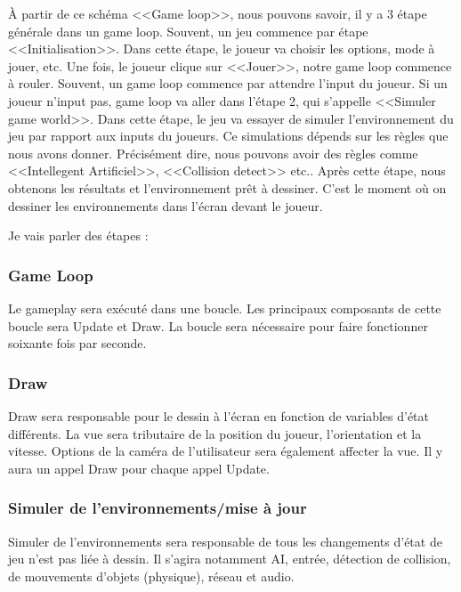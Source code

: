 
À partir de ce schéma <<Game loop>>, nous pouvons savoir, il y a 3 étape générale dans un game loop. Souvent, un jeu commence par étape <<Initialisation>>. Dans cette étape, le joueur va choisir les options, mode à jouer, etc. Une fois, le joueur clique sur <<Jouer>>, notre game loop commence à rouler. Souvent, un game loop commence par attendre l'input du joueur. Si un joueur n'input pas, game loop va aller dans l'étape 2, qui s'appelle <<Simuler game world>>. Dans cette étape, le jeu va essayer de simuler l'environnement du jeu par rapport aux inputs du joueurs. Ce simulations dépends sur les règles que nous avons donner. Précisément dire, nous pouvons avoir des règles comme <<Intellegent Artificiel>>, <<Collision detect>> etc.. Après cette étape, nous obtenons les résultats et l'environnement prêt à dessiner. C'est le moment où on dessiner les environnements dans l'écran devant le joueur.

Je vais parler des étapes :

\subsubsection{Game Loop} %
\label{ssub:game_loop}

Le gameplay sera exécuté dans une boucle. Les principaux composants de cette boucle sera Update et Draw. La boucle sera nécessaire pour faire fonctionner soixante fois par seconde.

\subsubsection{Draw} %
\label{ssub:draw}
Draw sera responsable pour le dessin à l'écran en fonction de variables d'état différents. La vue sera tributaire de la position du joueur, l'orientation et la vitesse. Options de la caméra de l'utilisateur sera également affecter la vue. Il y aura un appel Draw pour chaque appel Update.

\subsubsection{Simuler de l'environnements/mise à jour} %
\label{ssub:subsubsection_name}

Simuler de l'environnements sera responsable de tous les changements d'état de jeu n'est pas liée à dessin. Il s'agira notamment AI, entrée, détection de collision, de mouvements d'objets (physique), réseau et audio.


